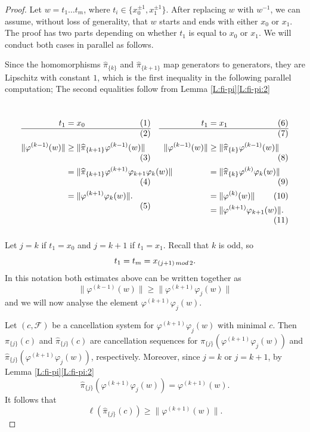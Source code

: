 \documentclass[10pt,a4paper]{amsart}
\newcommand{\C}[1]{{\mathscr #1}}
\begin{document}
\begin{proof}
Let $w=t_1\dots t_m$, where $t_i\in \{x_0^{\pm 1},x_1^{\pm 1}\}$. 
After replacing $w$ with
$w^{-1}$, we can assume, without loss of generality, that $w$ starts and ends 
with either $x_0$ or $x_1$. The proof has
two parts depending on whether $t_1$ is equal to $x_0$ or $x_1$. 
We will conduct both cases in parallel as follows.

Since the homomorphisms
$\widehat{\pi}_{\{k\}}$ and $\widehat{\pi}_{\{k+1\}}$ 
map generators to generators, they are Lipschitz with
constant $1$, which is the first inequality in the following
parallel computation; The second equalities follow from Lemma \ref{L:fi-pi}\ref{L:fi-pi:2}
$$
\begin{array}{cc}
\parbox[t]{0.45 \textwidth}{
\begin{align*}
t_1 &=x_0\\
\hline\\
\|\varphi^{(k-1)}(w)\|
&\geq \|\widehat{\pi}_{\{k+1\}}\varphi^{(k-1)}(w)\|\\
&=\|\widehat{\pi}_{\{k+1\}}\varphi^{(k+1)}\varphi_{k+1}\varphi_k(w)\|\\
&=\|\varphi^{(k+1)}\varphi_k(w)\|.
\end{align*}
}&
\parbox[t]{0.45 \textwidth}{
\begin{align*}
t_1 &= x_1\\
\hline\\
\|\varphi^{(k-1)}(w)\|
&\geq \|\widehat{\pi}_{\{k\}}\varphi^{(k-1)}(w)\|\\
&=\|\widehat{\pi}_{\{k\}}\varphi^{(k)}\varphi_k(w)\|\\
&=\|\varphi^{(k)}(w)\|\\
&=\|\varphi^{(k+1)}\varphi_{k+1}(w)\|.
\end{align*}
}
\end{array}
$$
Let $j = k$ if $t_1=x_0$ and $j = k+1$ if $t_1=x_1$.
Recall that $k$ is odd, so 
\[
t_1 = t_m=x_{(j+1)\,{\rm mod}\,2}.
\]
In this notation both estimates above can be written together as
\begin{equation}
\|\varphi^{(k-1)}(w)\|\geq \|\varphi^{(k+1)}\varphi_{j}(w)\|
\label{Eq:j-notation}
\end{equation}
and we will now analyse the element $\varphi^{(k+1)}\varphi_{j}(w)$.

Let $(c,\C F)$ be a cancellation system for
$\varphi^{(k+1)}\varphi_{j}(w)$ 
with minimal $c$.
Then $\pi_{\{j\}}(c)$ and $\widehat{\pi}_{\{j\}}(c)$ are cancellation 
sequences for
$\pi_{\{j\}}(\varphi^{(k+1)}\varphi_{j}(w))$ and 
$\widehat{\pi}_{\{j\}}(\varphi^{(k+1)}\varphi_{j}(w))$, respectively.
Moreover, since $j=k$ or $j=k+1$, by Lemma \ref{L:fi-pi}\ref{L:fi-pi:2}
$$
\widehat{\pi}_{\{j\}}(\varphi^{(k+1)}\varphi_{j}(w)) 
=\varphi^{(k+1)}(w).
$$
It follows that
\[
\ell(\widehat{\pi}_{\{j\}}(c))\geq \|\varphi^{(k+1)}(w)\|.
\]
%
%

\end{proof}
\end{document}
